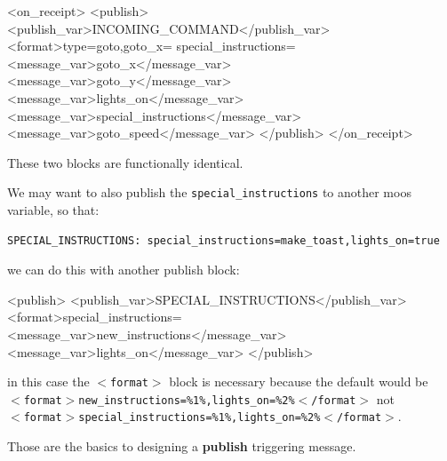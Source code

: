 \documentclass[11pt, letterpaper, oneside]{memoir}
\newcommand{\xmltag}[1]{\texttt{$<$#1$>$}}
\begin{document}
\begin{enumerate}
\begin{small}
\begin{boxedverbatim}
    <on_receipt>
      <publish>
        <publish_var>INCOMING_COMMAND</publish_var>
        <format>type=goto,goto_x=%
        special_instructions=%
        <message_var>goto_x</message_var>
        <message_var>goto_y</message_var>
        <message_var>lights_on</message_var>
        <message_var>special_instructions</message_var>
        <message_var>goto_speed</message_var>
      </publish>
    </on_receipt>
\end{boxedverbatim}
\resetbvlinenumber
\end{small}
These two blocks are functionally identical.

We may want to also publish the \verb|special_instructions| to another moos variable, so that:
\begin{verbatim}
SPECIAL_INSTRUCTIONS: special_instructions=make_toast,lights_on=true
\end{verbatim}
we can do this with another publish block:
\begin{small}
\begin{boxedverbatim}
    <publish>
      <publish_var>SPECIAL_INSTRUCTIONS</publish_var>
      <format>special_instructions=%
      <message_var>new_instructions</message_var>
      <message_var>lights_on</message_var>
    </publish>
\end{boxedverbatim}
\resetbvlinenumber
\end{small}
in this case the \xmltag{format} block is necessary because the default would be \\ 
\xmltag{format$>$new\_instructions=\%1\%,lights\_on=\%2\%$<$/format} not \\
\xmltag{format$>$special\_instructions=\%1\%,lights\_on=\%2\%$<$/format}.
\end{enumerate}

Those are the basics to designing a \textbf{publish} triggering message.
\end{document}
